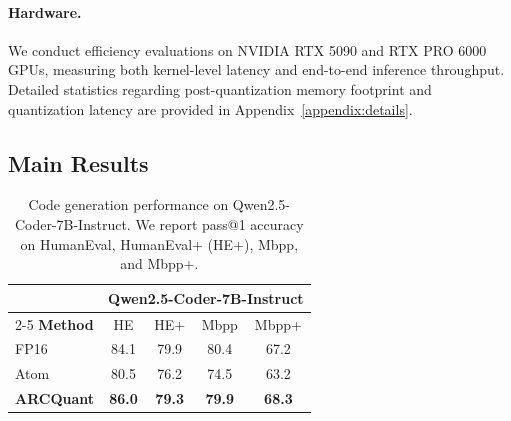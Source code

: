 \documentclass[11pt]{article}
\begin{document}
\paragraph{Hardware.} We conduct efficiency evaluations on NVIDIA RTX 5090 and RTX PRO 6000 GPUs, measuring both kernel-level latency and end-to-end inference throughput. Detailed statistics regarding post-quantization memory footprint and quantization latency are provided in Appendix~\ref{appendix:details}.




\subsection{Main Results}

\begin{table}[t]
\centering
\caption{Code generation performance on Qwen2.5-Coder-7B-Instruct. We report pass@1 accuracy on HumanEval, HumanEval+ (HE+), Mbpp, and Mbpp+.}
\label{tab:code_results}
\setlength{\tabcolsep}{4.5pt}
\begin{tabular}{l|cccc}
\toprule
 & \multicolumn{4}{c}{\textbf{Qwen2.5-Coder-7B-Instruct}} \\
\cmidrule(lr){2-5}
\textbf{Method} & HE & HE+ & Mbpp & Mbpp+ \\
\midrule
FP16 & 84.1 & 79.9 & 80.4 & 67.2 \\
\midrule
Atom & 80.5 & 76.2 & 74.5 & 63.2 \\
\rowcolor{lightpink} \textbf{ARCQuant} & \textbf{86.0} & \textbf{79.3} & \textbf{79.9} & \textbf{68.3} \\
\bottomrule
\end{tabular}
\end{table}
\end{document}
